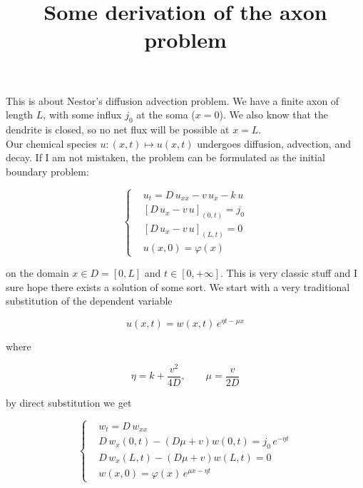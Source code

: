 \documentclass[a4paper, 10pt]{article}
\title{Some derivation of the axon problem}
\author{}
\begin{document}
  \maketitle

  This is about Nestor's diffusion advection problem. We have a finite axon of
  length $L$, with some influx $j_0$ at the soma ($x=0$). We also know that the
  dendrite is closed, so no net flux will be possible at $x=L$.\\
  Our chemical species $u : (x,t) \mapsto u(x,t)$ undergoes diffusion,
  advection, and decay. If I am not mistaken, the problem can be formulated as
  the initial boundary problem:

  \begin{equation}\label{eq:problem}
    \left\{ \begin{aligned}
      &u_t = D \, u_{xx} - v \, u_x - k \, u\\
      &\left[D \, u_x - v \, u\right]_{(0,t)} = j_0\\
      &\left[D \, u_x - v \, u\right]_{(L,t)} = 0\\
      &u(x,0) = \varphi(x)
    \end{aligned}\right.
  \end{equation}
  
  on the domain $x \in D = [0, L]$ and $t \in [0, +\infty]$.
  This is very classic stuff and I sure hope there exists a solution of
  some sort. We start with a very traditional substitution of the dependent
  variable

  \begin{equation}\label{eq:change}
    u(x,t) = w(x,t) \, e^{\eta t - \mu x}  
  \end{equation}

  where

  \begin{equation}
    \eta = k + \frac{v^2}{4D}, \qquad \mu = \frac{v}{2D}
  \end{equation}
  
  by direct substitution we get 

  \begin{equation}\label{eq:diffusion:w}
    \left\{ \begin{aligned}
      &w_t = D \, w_{xx}\\
      &D \, w_x(0, t)  - (D \mu + v) w(0,t)  = j_0 \, e^{-\eta t}\\
      &D \, w_x(L, t)  - (D \mu + v) w(L,t)  = 0\\
      &w(x,0) = \varphi(x) \, e^{\mu x - \eta t} 
    \end{aligned}\right.
  \end{equation}
  
\end{document}
